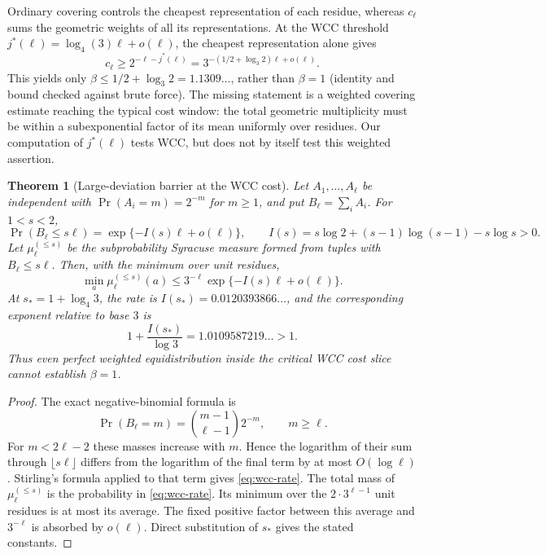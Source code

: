 \documentclass[11pt]{article}
\newtheorem{theorem}{Theorem}[section]
\theoremstyle{definition}
\theoremstyle{remark}
\begin{document}
Ordinary covering controls the cheapest representation of each residue,
whereas $c_\ell$ sums the geometric weights of all its representations.
At the WCC threshold $j^\ast(\ell)=\log_4(3)\ell+o(\ell)$, the cheapest
representation alone gives
\[
 c_\ell\ge 2^{-\ell-j^\ast(\ell)}
 =3^{-(1/2+\log_3 2)\ell+o(\ell)}.
\]
This yields only $\beta\le 1/2+\log_3 2=1.1309\ldots$, rather than
$\beta=1$ (identity and bound checked against brute force).
The missing statement is a weighted covering estimate reaching the
typical cost window: the total geometric multiplicity must be within a
subexponential factor of its mean uniformly over residues. Our
computation of $j^\ast(\ell)$ tests WCC, but does not by itself test
this weighted assertion.

\begin{theorem}[Large-deviation barrier at the WCC cost]
\label{thm:wcc-large-deviation}
Let $A_1,\ldots,A_\ell$ be independent with
$\Pr(A_i=m)=2^{-m}$ for $m\ge1$, and put $B_\ell=\sum_iA_i$. For
$1<s<2$,
\begin{equation}\label{eq:wcc-rate}
 \Pr(B_\ell\le s\ell)
 =\exp\{-I(s)\ell+o(\ell)\},
 \qquad
 I(s)=s\log2+(s-1)\log(s-1)-s\log s>0.
\end{equation}
Let $\mu_\ell^{(\le s)}$ be the subprobability Syracuse measure formed
from tuples with $B_\ell\le s\ell$. Then, with the minimum over unit
residues,
\[
 \min_a\mu_\ell^{(\le s)}(a)
 \le 3^{-\ell}\exp\{-I(s)\ell+o(\ell)\}.
\]
At $s_\ast=1+\log_4 3$, the rate is
$I(s_\ast)=0.0120393866\ldots$, and the corresponding exponent relative
to base $3$ is
\[
 1+\frac{I(s_\ast)}{\log3}=1.0109587219\ldots>1.
\]
Thus even perfect weighted equidistribution inside the critical WCC
cost slice cannot establish $\beta=1$.
\end{theorem}

\begin{proof}
The exact negative-binomial formula is
\[
 \Pr(B_\ell=m)={m-1\choose\ell-1}2^{-m},\qquad m\ge\ell.
\]
For $m<2\ell-2$ these masses increase with $m$. Hence the logarithm of
their sum through $\lfloor s\ell\rfloor$ differs from the logarithm of
the final term by at most $O(\log\ell)$. Stirling's formula applied to
that term gives \eqref{eq:wcc-rate}. The total mass of
$\mu_\ell^{(\le s)}$ is the probability in \eqref{eq:wcc-rate}. Its
minimum over the $2\cdot3^{\ell-1}$ unit residues is at most its
average. The fixed positive factor between this average and
$3^{-\ell}$ is absorbed by $o(\ell)$. Direct substitution of
$s_\ast$ gives the stated constants.
\end{proof}
\end{document}
